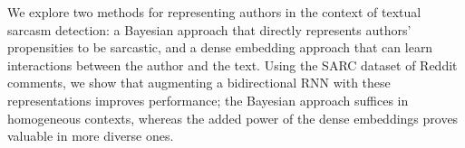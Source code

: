 We explore two methods for representing authors in the context of textual sarcasm detection: a Bayesian approach that directly represents authors' propensities to be sarcastic, and a dense embedding approach that can learn interactions between the author and the text. Using the SARC dataset of Reddit comments, we show that augmenting a bidirectional RNN with these representations improves performance; the Bayesian approach suffices in homogeneous contexts, whereas the added power of the dense embeddings proves valuable in more diverse ones.
